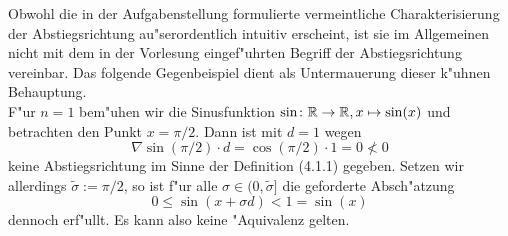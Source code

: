 Obwohl die in der Aufgabenstellung formulierte vermeintliche Charakterisierung
der Abstiegsrichtung au"serordentlich intuitiv erscheint, ist sie im Allgemeinen
nicht mit dem in der Vorlesung eingef"uhrten Begriff der Abstiegsrichtung vereinbar.
Das folgende Gegenbeispiel dient als Untermauerung dieser k"uhnen Behauptung.\\

F"ur $n=1$ bem"uhen wir die Sinusfunktion $\sin\colon\mathbb{R}\to\mathbb{R}, x\mapsto\sin(x)$
und betrachten den Punkt $x = \pi /2$. Dann ist mit $d=1$ wegen
\[
\nabla \sin(\pi/2)\cdot d = \cos(\pi/2) \cdot 1 = 0 \nless 0
\]
keine Abstiegsrichtung im Sinne der Definition (4.1.1) gegeben. Setzen wir allerdings
$\widetilde{\sigma} := \pi/2$, so ist f"ur alle $\sigma\in (0,\widetilde{\sigma}]$
die geforderte Absch"atzung
\[
0 \le \sin(x + \sigma d) < 1 = \sin(x)
\]
dennoch erf"ullt. Es kann also keine "Aquivalenz gelten.
